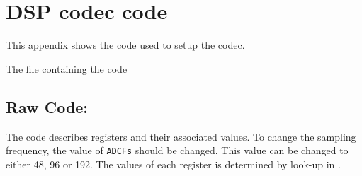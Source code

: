 \section{DSP codec code}\label{sec:codecsetup}

This appendix shows the code used to setup the codec.

The file containing the code  
\subsection{Raw Code:}

The code describes registers and their associated values. To change the sampling frequency, the value of \verb|ADCFs| should be changed. This value can be changed to either 48, 96 or 192. The values of each register is determined by look-up in .



